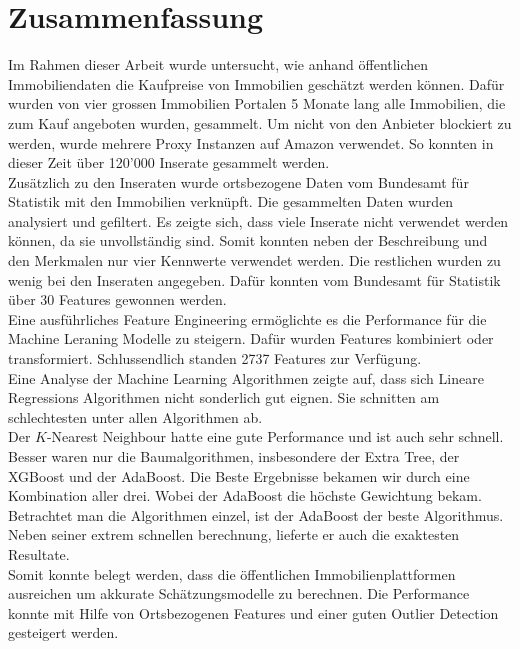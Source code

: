 \section{Zusammenfassung}
Im Rahmen dieser Arbeit wurde untersucht, wie anhand öffentlichen Immobiliendaten die Kaufpreise von Immobilien geschätzt werden können. Dafür wurden von vier grossen Immobilien Portalen 5 Monate lang alle Immobilien, die zum Kauf angeboten wurden, gesammelt. Um nicht von den Anbieter blockiert zu werden, wurde mehrere Proxy Instanzen auf Amazon verwendet. So konnten in dieser Zeit über 120’000 Inserate gesammelt werden.\\
Zusätzlich zu den Inseraten wurde ortsbezogene Daten vom Bundesamt für Statistik mit den Immobilien verknüpft.
Die gesammelten Daten wurden analysiert und gefiltert. Es zeigte sich, dass viele Inserate nicht verwendet werden können, da sie unvollständig sind. Somit konnten neben der Beschreibung und den Merkmalen nur vier Kennwerte verwendet werden. Die restlichen wurden zu wenig bei den Inseraten angegeben. Dafür konnten vom Bundesamt für Statistik über 30 Features gewonnen werden.\\
Eine ausführliches Feature Engineering ermöglichte es die Performance für die Machine Leraning Modelle zu steigern. Dafür wurden Features kombiniert oder transformiert. Schlussendlich standen 2737 Features zur Verfügung.\\
Eine Analyse der Machine Learning Algorithmen zeigte auf, dass sich Lineare Regressions Algorithmen nicht sonderlich gut eignen. Sie schnitten am schlechtesten unter allen Algorithmen ab.\\
Der $K$-Nearest Neighbour hatte eine gute Performance und ist auch sehr schnell. Besser waren nur die Baumalgorithmen, insbesondere der Extra Tree, der XGBoost und der AdaBoost. Die Beste Ergebnisse bekamen wir durch eine Kombination aller drei. Wobei der AdaBoost die höchste Gewichtung bekam.\\
Betrachtet man die Algorithmen einzel, ist der AdaBoost der beste Algorithmus. Neben seiner extrem schnellen berechnung, lieferte er auch die exaktesten Resultate.\\[2ex]

Somit konnte belegt werden, dass die öffentlichen Immobilienplattformen ausreichen um akkurate Schätzungsmodelle zu berechnen. Die Performance konnte mit Hilfe von Ortsbezogenen Features und einer guten Outlier Detection gesteigert werden.
